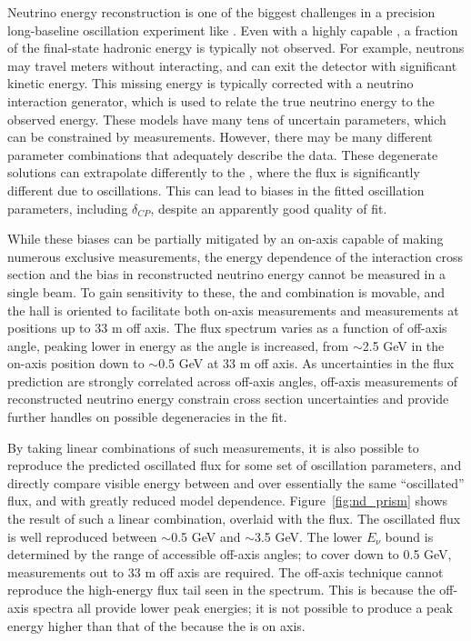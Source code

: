Neutrino energy reconstruction is one of the biggest challenges in a precision long-baseline oscillation experiment like . Even with a highly capable , a fraction of the final-state hadronic energy is typically not observed. For example, neutrons may travel meters without interacting, and can exit the detector with significant kinetic energy. This missing energy is typically corrected with a neutrino interaction generator, which is used to relate the true neutrino energy to the observed energy. These models have many tens of uncertain parameters, which can be constrained by  measurements. However, there may be many different parameter combinations that adequately describe the  data. These degenerate solutions can extrapolate differently to the , where the flux is significantly different due to oscillations. This can lead to biases in the fitted oscillation parameters, including $\delta_{CP}$, despite an apparently good quality of fit.

While these biases can be partially mitigated by an on-axis  capable of making numerous exclusive measurements, the energy dependence of the interaction cross section and the bias in reconstructed neutrino energy cannot be measured in a single beam. To gain sensitivity to these, the  and  combination is movable, and the  hall is oriented to facilitate both on-axis measurements and measurements at positions up to 33 m off axis. The flux spectrum varies as a function of off-axis angle, peaking lower in energy as the angle is increased, from $\sim$2.5 GeV in the on-axis position down to $\sim$0.5 GeV at 33 m off axis. As uncertainties in the flux prediction are strongly correlated across off-axis angles, off-axis measurements of reconstructed neutrino energy constrain cross section uncertainties and provide further handles on possible degeneracies in the fit. 

By taking linear combinations of such measurements, it is also possible to reproduce the predicted  oscillated flux for some set of oscillation parameters, and directly compare visible energy between  and  over essentially the same ``oscillated'' flux, and with greatly reduced model dependence. Figure~\ref{fig:nd_prism} shows the result of such a linear combination, overlaid with the  flux. The oscillated flux is well reproduced between $\sim$0.5 GeV and $\sim$3.5 GeV. The lower $E_{\nu}$ bound is determined by the range of accessible off-axis angles; to cover down to 0.5 GeV, measurements out to 33 m off axis are required. The off-axis technique cannot reproduce the high-energy flux tail seen in the  spectrum. This is because the off-axis spectra all provide lower peak energies; it is not possible to produce a peak energy higher than that of the  because the  is on axis.

